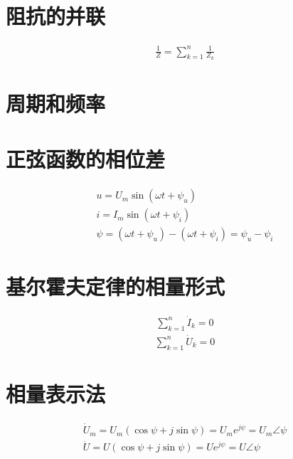 \documentclass{ctexart}
\begin{document}
\section{阻抗的并联}
\begin{gather*}
\frac{1}{Z} = \sum_{k=1}^n \frac{1}{Z_k}
\end{gather*}

\section{周期和频率}

\newpage

\section{正弦函数的相位差}
\begin{gather*}
u = U_m\sin(\omega t + \psi_u) \\
i = I_m\sin(\omega t + \psi_i) \\
\psi = (\omega t + \psi_u) - (\omega t + \psi_i) = \psi_u - \psi_i
\end{gather*}

\section{基尔霍夫定律的相量形式}
\begin{gather*}
\sum_{k=1}^n \dot{I}_k = 0
\end{gather*}
\begin{gather*}
\sum_{k=1}^n \dot{U}_k = 0
\end{gather*}

\section{相量表示法}
\begin{gather*}
\dot{U}_m = U_m(\cos\psi + j\sin\psi) = U_{m}e^{j\psi} = U_m\angle\psi \\
\dot{U} = U(\cos\psi + j\sin\psi) = Ue^{j\psi} = U\angle\psi
\end{gather*}
\end{document}
